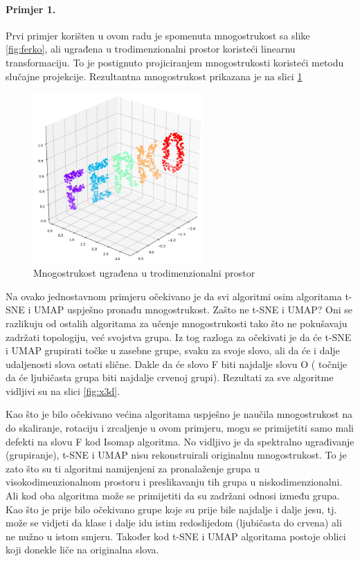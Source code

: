 \documentclass[times, utf8, diplomski]{fer}
\begin{document}
\paragraph{Primjer 1.}
Prvi primjer korišten u ovom radu je spomenuta mnogostrukost sa slike \ref{fig:ferko}, ali ugrađena u trodimenzionalni prostor koristeći linearnu transformaciju. To je postignuto projiciranjem mnogostrukosti koristeći metodu slučajne projekcije. Rezultantna mnogostrukost prikazana je na slici \ref{fig:ferko3d}

\begin{figure}[htb]
    \centering
    \includegraphics[width=6.5cm]{resources/images/reduction/compare/ferko3d.png}
    \caption{Mnogostrukost ugrađena u trodimenzionalni prostor}
    \label{fig:ferko3d}
\end{figure}

Na ovako jednostavnom primjeru očekivano je da svi algoritmi osim algoritama t-SNE i UMAP uspješno pronađu mnogostrukost. Zašto ne t-SNE i UMAP? Oni se razlikuju od ostalih algoritama za učenje mnogostrukosti tako što ne pokušavaju zadržati topologiju, već svojstva grupa. Iz tog razloga za očekivati je da će t-SNE i UMAP grupirati točke u zasebne grupe, svaku za svoje slovo, ali da će i dalje udaljenosti slova ostati slične. Dakle da će slovo F biti najdalje slovu O ( točnije da će ljubičasta grupa biti najdalje crvenoj grupi). Rezultati za sve algoritme vidljivi su na slici \ref{fig:x3d}.

Kao što je bilo očekivano većina algoritama uspješno je naučila mnogostrukost na do skaliranje, rotaciju i zrcaljenje u ovom primjeru, mogu se primijetiti samo mali defekti na slovu F kod Isomap algoritma. No vidljivo je da spektralno ugrađivanje (grupiranje), t-SNE i UMAP nisu rekonstruirali originalnu mnogostrukost. To je zato što su ti algoritmi namijenjeni za pronalaženje grupa u visokodimenzionalnom prostoru i preslikavanju tih grupa u niskodimenzionalni. Ali kod oba algoritma može se primijetiti da su zadržani odnosi između grupa. Kao što je prije bilo očekivano grupe koje su prije bile najdalje i dalje jesu, tj. može se vidjeti da klase i dalje idu istim redoslijedom (ljubičasta do crvena) ali ne nužno u istom smjeru. Također kod t-SNE i UMAP algoritama postoje oblici koji donekle liče na originalna slova.
\end{document}
